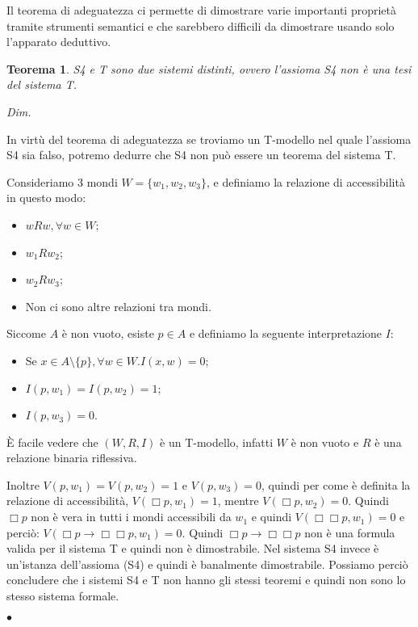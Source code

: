 \documentclass[a4paper, titlepage, 12pt]{report}
\newtheorem{theorem}{Teorema}[chapter]
\newenvironment{proof}
    {\textit{Dim.}
    }
    {\begin{flushright}$\bullet$\end{flushright}
    }
\begin{document}
Il teorema di adeguatezza ci permette di dimostrare varie importanti proprietà tramite
strumenti semantici e che sarebbero difficili da dimostrare usando solo l'apparato deduttivo.

\begin{theorem}
S4 e T sono due sistemi distinti, ovvero l'assioma S4 non è una tesi del sistema T.
\end{theorem}

\begin{proof}
In virtù del teorema di adeguatezza se troviamo un T-modello nel quale l'assioma S4
sia falso, potremo dedurre che S4 non può essere un teorema del sistema T.

Consideriamo 3 mondi $W = \{w_1, w_2, w_3\}$, e definiamo la relazione di accessibilità
in questo modo:
\begin{itemize}
    \item $wRw, \forall w \in W$;
    \item $w_1Rw_2$;
    \item $w_2Rw_3$;
    \item Non ci sono altre relazioni tra mondi.
\end{itemize}

Siccome $A$ è non vuoto, esiste $p \in A$ e definiamo la seguente interpretazione $I:$
\begin{itemize}
    \item Se $x \in A \setminus \{p\}, \forall w \in W. I(x, w) = 0$;
    \item $I(p, w_1) = I(p, w_2) = 1$;
    \item $I(p, w_3) = 0$.
\end{itemize}

È facile vedere che $(W, R, I)$ è un T-modello, infatti $W$ è non vuoto e $R$ è una relazione binaria riflessiva.

Inoltre $V(p, w_1) = V(p, w_2) = 1$ e $V(p, w_3) = 0$, quindi per come è definita
la relazione di accessibilità, $V(\Box p, w_1) = 1$, mentre
$V(\Box p, w_2) = 0$. Quindi $\Box p$ non è vera in tutti i mondi accessibili da $w_1$
e quindi $V(\Box \Box p, w_1) = 0$ e perciò: $V(\Box p \rightarrow \Box\Box p, w_1) = 0$.
Quindi $\Box p \rightarrow \Box\Box p$ non è una formula valida per il sistema T e quindi
non è dimostrabile.
Nel sistema S4 invece è un'istanza dell'assioma (S4) e quindi è banalmente dimostrabile.
Possiamo perciò concludere che i sistemi S4 e T non hanno gli stessi teoremi e quindi non
sono lo stesso sistema formale.
\end{proof}
\end{document}
